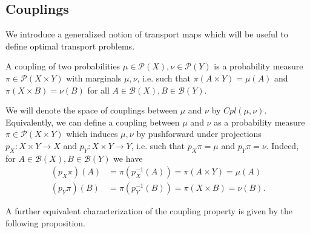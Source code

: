 \documentclass[../main.tex]{subfiles}
\begin{document}
\subsection{Couplings}
We introduce a generalized notion of transport maps which will be useful to define optimal transport problems.

\begin{definition}
    A coupling of two probabilities $\mu\in\mathcal{P}(X), \nu\in\mathcal{P}(Y)$ is a probability measure $\pi\in\mathcal{P}(X\times Y)$ with marginals $\mu, \nu$, i.e. such that $\pi(A\times Y) = \mu(A)$ and $\pi(X\times B)=\nu(B)$ for all $A\in\mathcal{B}(X), B\in\mathcal{B}(Y)$. 
\end{definition}

We will denote the space of couplings between $\mu$ and $\nu$ by $Cpl(\mu,  \nu)$.\\
Equivalently, we can define a coupling between $\mu$ and $\nu$ as a probability measure $\pi\in\mathcal{P}(X\times Y)$ which induces $\mu, \nu$ by pushforward under projections $p_X : X\times Y \to X$ and $p_Y : X\times Y \to Y$, i.e. such that $p_X\pi = \mu$ and $p_Y\pi = \nu$. Indeed, for $A\in\mathcal{B}(X), B\in\mathcal{B}(Y)$ we have
\begin{align*}
    (p_X\pi)(A) &= \pi(p^{-1}_X(A)) = \pi(A\times Y) = \mu(A) \\
    (p_Y\pi)(B) &= \pi(p^{-1}_Y(B)) = \pi(X\times B) = \nu(B).
\end{align*}

A further equivalent characterization of the coupling property is given by the following proposition.
\end{document}
